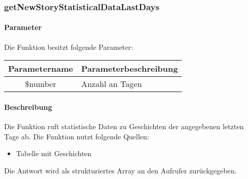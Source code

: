 \subsubsection{getNewStoryStatisticalDataLastDays}
\paragraph{Parameter} Die Funktion besitzt folgende Parameter:
\begin{table}[H]
	\begin{tabular}{|c|p{11cm}|}
		\hline
		\textbf{Parametername} & \textbf{Parameterbeschreibung} \\ \hline
		\$number & Anzahl an Tagen \\ \hline
	\end{tabular}
\end{table}
\paragraph{Beschreibung} Die Funktion ruft statistische Daten zu Geschichten der angegebenen letzten Tage ab. Die Funktion nutzt folgende Quellen:
\begin{itemize}
	\item Tabelle mit Geschichten
\end{itemize}
Die Antwort wird als strukturiertes Array an den Aufrufer zurückgegeben.